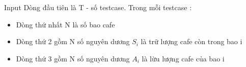 Input
Dòng đầu tiên là T - số testcase. Trong mỗi testcase :
\begin{itemize}
	\item Dòng thứ nhất N là số bao cafe
	\item Dòng thứ 2 gồm N số nguyên dương $S_{i}$ là trữ lượng cafe còn trong bao i
	\item Dòng thứ 3 gồm N số nguyên dương $A_{i}$ là lừu lượng cafe của bao i
\end{itemize}